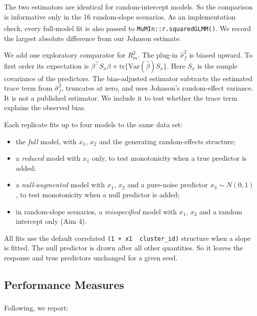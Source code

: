 \documentclass[
  11pt,
]{article}
\providecommand{\tightlist}{%
  \setlength{\itemsep}{0pt}\setlength{\parskip}{0pt}}
\begin{document}
The two estimators are identical for random-intercept models. So
the comparison is informative only in the 16 random-slope
scenarios. As an implementation check, every full-model fit is
also passed to \texttt{MuMIn::r.squaredGLMM()}\textsuperscript{}. We
record the largest absolute difference from our Johnson estimate.

We add one exploratory comparator for \(R^2_m\). The plug-in
\(\hat\sigma^2_f\) is biased upward. To first order its expectation
is \(\beta^\top S_x \beta + \text{tr}\{\text{Var}(\hat\beta) S_x\}\).
Here \(S_x\) is the sample covariance of the predictors. The
bias-adjusted estimator subtracts the estimated trace term from
\(\hat\sigma^2_f\), truncates at zero, and uses Johnson's
random-effect variance. It is not a published estimator. We
include it to test whether the trace term explains the observed
bias.

Each replicate fits up to four models to the same data set:

\begin{itemize}
\tightlist
\item
  the \emph{full} model, with \(x_1\), \(x_2\) and the generating
  random-effects structure;
\item
  a \emph{reduced} model with \(x_1\) only, to test monotonicity when a
  true predictor is added;
\item
  a \emph{null-augmented} model with \(x_1\), \(x_2\) and a pure-noise
  predictor \(x_3 \sim N(0, 1)\), to test monotonicity when a null
  predictor is added;
\item
  in random-slope scenarios, a \emph{misspecified} model with
  \(x_1\), \(x_2\) and a random intercept only (Aim 4).
\end{itemize}

All fits use the default correlated
\texttt{(1\ +\ x1\ \textbar{}\ cluster\_id)} structure when a slope is fitted. The
null predictor is drawn after all other quantities. So it leaves
the response and true predictors unchanged for a given seed.

\subsection{Performance Measures}\label{performance-measures}

Following\textsuperscript{}, we report:
\end{document}
